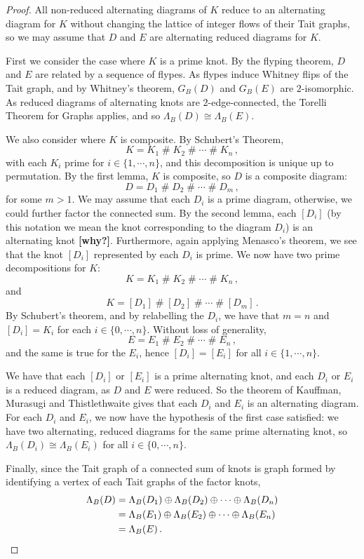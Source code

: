 \documentclass[12pt]{report}
\newcommand{\hash}{\ensuremath{\mathbin{\#}}}
\newcommand{\notered}[1]{{\color{Red} \textbf{#1}}}
\begin{document}
\begin{proof}
All non-reduced alternating diagrams of $K$ reduce to an alternating diagram for $K$ without changing the lattice of integer flows of their Tait graphs, so we may assume that $D$ and $E$ are alternating reduced diagrams for $K$. 

First we consider the case where $K$ is a prime knot. By the flyping theorem, $D$ and $E$ are related by a sequence of flypes. As flypes induce Whitney flips of the Tait graph, and by Whitney's theorem, $G_{B}(D)$ and $G_{B}(E)$ are $2$-isomorphic. As reduced diagrams of alternating knots are $2$-edge-connected, the Torelli Theorem for Graphs applies, and so $\Lambda_{B}(D) \cong \Lambda_{B}(E)$.

We also consider where $K$ is composite. By Schubert's Theorem,
\[K = K_{1}  \hash K_{2}  \hash \cdots  \hash K_{n}\,,\]
with each $K_{i}$ prime for $i \in \{1, \cdots, n\}$, and this decomposition is unique up to permutation. By the first lemma, $K$ is composite, so $D$ is a composite diagram:
\[D = D_{1}  \hash D_{2}  \hash \cdots  \hash D_{m}\,,\]
for some $m > 1$. We may assume that each $D_{i}$ is a prime diagram, otherwise, we could further factor the connected sum. By the second lemma, each $[D_{i}]$ (by this notation we mean the knot corresponding to the diagram $D_{i}$) is an alternating knot \notered{[why?]}. Furthermore, again applying Menasco's theorem, we see that the knot $[D_{i}]$ represented by each $D_{i}$ is prime. We now have two prime decompositions for $K$:
\[K = K_{1}  \hash K_{2}  \hash \cdots  \hash K_{n}\,,\]
and
\[K = [D_{1}]  \hash [D_{2}]  \hash \cdots  \hash [D_{m}]\,.\]
By Schubert's theorem, and by relabelling the $D_{i}$, we have that $m = n$ and $[D_{i}] = K_{i}$
for each $i \in \{0, \cdots, n\}$. Without loss of generality, \[E = E_{1} \hash E_{2} \hash \cdots \hash E_{n}\,,\] and the same is true for the $E_{i}$, hence
$[D_{i}] = [E_{i}]$
for all $i \in \{1, \cdots, n\}$.

We have that each $[D_{i}]$ or $[E_{i}]$ is a prime alternating knot, and each $D_{i}$ or $E_{i}$ is a reduced diagram, as $D$ and $E$ were reduced. So the theorem of Kauffman, Murasugi and Thistlethwaite gives that each $D_{i}$ and $E_{i}$ is an alternating diagram. For each $D_{i}$ and $E_{i}$, we now have the hypothesis of the first case satisfied: we have two alternating, reduced diagrams for the same prime alternating knot, so $\Lambda_{B}(D_{i}) \cong \Lambda_{B}(E_{i})$ for all $i \in \{0, \cdots, n\}$.

Finally, since the Tait graph of a connected sum of knots is graph formed by identifying a vertex of each Tait graphs of the factor knots,
\begin{align*}
	\Lambda_{B}(D) & = \Lambda_{B}(D_{1}) \oplus \Lambda_{B}(D_{2}) \oplus \cdots \oplus \Lambda_{B}(D_{n}) \\
	               & = \Lambda_{B}(E_{1}) \oplus \Lambda_{B}(E_{2}) \oplus \cdots \oplus \Lambda_{B}(E_{n})\\
	               & = \Lambda_{B}(E)\,. \qedhere \\ 
\end{align*}
\end{proof}
\end{document}
